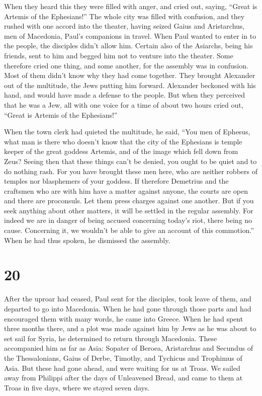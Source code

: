  When they heard this they were filled with anger, and
cried out, saying, ``Great is Artemis of the Ephesians!''
 The whole city was filled with confusion, and they
rushed with one accord into the theater, having seized Gaius and
Aristarchus, men of Macedonia, Paul's companions in travel.
 When Paul wanted to enter in to the people, the
disciples didn't allow him.  Certain also of the
Asiarchs, being his friends, sent to him and begged him not to venture
into the theater.  Some therefore cried one thing, and
some another, for the assembly was in confusion. Most of them didn't
know why they had come together.  They brought Alexander
out of the multitude, the Jews putting him forward. Alexander beckoned
with his hand, and would have made a defense to the people.
 But when they perceived that he was a Jew, all with one
voice for a time of about two hours cried out, ``Great is Artemis of the
Ephesians!''

 When the town clerk had quieted the multitude, he said,
``You men of Ephesus, what man is there who doesn't know that the city
of the Ephesians is temple keeper of the great goddess Artemis, and of
the image which fell down from Zeus?  Seeing then that
these things can't be denied, you ought to be quiet and to do nothing
rash.  For you have brought these men here, who are
neither robbers of temples nor blasphemers of your goddess.
 If therefore Demetrius and the craftsmen who are with
him have a matter against anyone, the courts are open and there are
proconsuls. Let them press charges against one another. 
But if you seek anything about other matters, it will be settled in the
regular assembly.  For indeed we are in danger of being
accused concerning today's riot, there being no cause. Concerning it, we
wouldn't be able to give an account of this commotion.'' 
When he had thus spoken, he dismissed the assembly.

\hypertarget{section-19}{%
\section{20}\label{section-19}}

 After the uproar had ceased, Paul sent for the disciples,
took leave of them, and departed to go into Macedonia. 
When he had gone through those parts and had encouraged them with many
words, he came into Greece.  When he had spent three
months there, and a plot was made against him by Jews as he was about to
set sail for Syria, he determined to return through Macedonia.
 These accompanied him as far as Asia: Sopater of Beroea,
Aristarchus and Secundus of the Thessalonians, Gaius of Derbe, Timothy,
and Tychicus and Trophimus of Asia.  But these had gone
ahead, and were waiting for us at Troas.  We sailed away
from Philippi after the days of Unleavened Bread, and came to them at
Troas in five days, where we stayed seven days.


